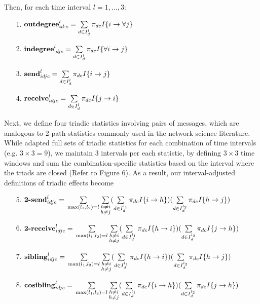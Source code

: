 \documentclass[twoside]{article}
\begin{document}
    Then, for each time interval $l=1,\ldots,3$:
    \begin{itemize}
    	  	 \footnotesize
    	\item [1.]  $\mbox{\textbf{outdegree}}^l_{id\cdot c}=\sum\limits_{d \in I_{d}^{l}}\pi_{dc}I\{i\rightarrow \forall j\}$
    	\item [2.] $\mbox{\textbf{indegree}}^l_{\cdot dj c}=\sum\limits_{d \in I_{d}^{l}}\pi_{dc}I\{\forall i \rightarrow j\}$	 	 	
    	\item [3.]  $\mbox{\textbf{send}}^l_{idjc}=\sum\limits_{d \in I_{d}^{l}}\pi_{dc} I\{i\rightarrow j\}$
    	\item [4.] $\mbox{\textbf{receive}}^l_{idjc}=\sum\limits_{d\in I_{d}^{l}}\pi_{dc} I\{j\rightarrow i\}$
    \end{itemize}
    \normalsize
    Next, we define four triadic statistics involving pairs of messages, which are analogous to 2-path statistics commonly used in the network science literature. While \cite{PerryWolfe2012} adapted full sets of triadic statistics for each combination of time intervals (e.g. $3 \times 3=9$), we maintain 3 intervals per each statistic, by defining $3 \times 3$ time windows and sum the combination-specific statistics based on the interval where the triads are closed (Refer to Figure 6). As a result, our interval-adjusted definitions of triadic effects become
    \begin{itemize}
    	\footnotesize
    	\item [5.] $\mbox{\textbf{2-send}}^l_{idjc}=\vspace{3mm}\\\sum\limits_{\substack{\max(l_1,l_2)= l} }\sum\limits_{\substack{h \neq i\\h \neq  j} }(\sum\limits_{d\in I_{d}^{l_1}}\pi_{dc} I\{i\rightarrow h\})(\sum\limits_{d\in I_{d}^{l_2}}\pi_{dc}I\{h\rightarrow j\})$\\
    	\item [6.] $\mbox{\textbf{2-receive}}^l_{idjc}=\vspace{3mm}\\\sum\limits_{\substack{\max(l_1,l_2)= l} }\sum\limits_{\substack{h \neq i\\h \neq  j} }(\sum\limits_{d \in I_{d}^{l_1}}\pi_{dc} I\{h\rightarrow i\})(\sum\limits_{d\in I_{d}^{l_2}}\pi_{dc} I\{j\rightarrow h\})$
    	\item [7.] $\mbox{\textbf{sibling}}^l_{idjc}=\vspace{3mm}\\\sum\limits_{\substack{\max(l_1,l_2)= l} }\sum\limits_{\substack{h \neq i\\h \neq  j} }(\sum\limits_{d\in I_{d}^{l_1}}\pi_{dc} I\{h\rightarrow i\}) (\sum\limits_{d\in I_{d}^{l_2}}\pi_{dc}I\{h\rightarrow j\})$
    	\item [8.] $\mbox{\textbf{cosibling}}^l_{idjc}=\vspace{3mm}\\\sum\limits_{\substack{\max(l_1,l_2)= l}}\sum\limits_{\substack{h \neq i\\h \neq  j} }(\sum\limits_{d \in I_{d}^{l_1}}\pi_{dc} I\{i\rightarrow h\})(\sum\limits_{d\in I_{d}^{l_2}}\pi_{dc}I\{j\rightarrow h\})$
    \end{itemize}
\end{document}
